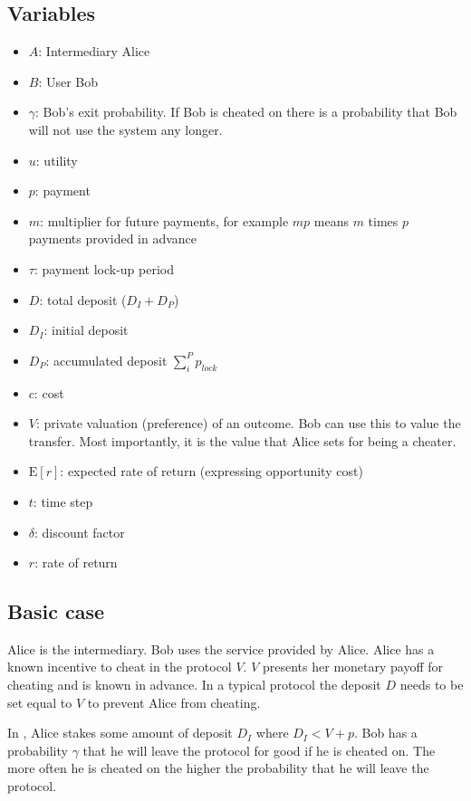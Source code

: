 \subsection{Variables}
\begin{itemize}
    \item $A$: Intermediary Alice
    \item $B$: User Bob
    \item $\gamma$: Bob's exit probability. If Bob is cheated on there is a probability that Bob will not use the system any longer.
    \item $u$: utility
    \item $p$: payment
    \item $m$: multiplier for future payments, for example $mp$ means $m$ times $p$ payments provided in advance
    \item $\tau$: payment lock-up period
    \item $D$: total deposit ($D_I + D_P$)
    \item $D_I$: initial deposit
    \item $D_P$: accumulated deposit $\sum_i^{P} p_{lock}$
    \item $c$: cost
    \item $V$: private valuation (preference) of an outcome. Bob can use this to value the transfer. Most importantly, it is the value that Alice sets for being a cheater.
    \item $\mathrm{E}[r]$: expected rate of return (expressing opportunity cost)
    \item $t$: time step
    \item $\delta$: discount factor
    \item $r$: rate of return
\end{itemize}

\subsection{Basic case}
Alice is the intermediary.
Bob uses the service provided by Alice.
Alice has a known incentive to cheat in the protocol $V$.
$V$ presents her monetary payoff for cheating and is known in advance.
In a typical protocol the deposit $D$ needs to be set equal to $V$ to prevent Alice from cheating.

In \sys, Alice stakes some amount of deposit $D_I$ where $D_I < V + p$.
Bob has a probability $\gamma$ that he will leave the protocol for good if he is cheated on.
The more often he is cheated on the higher the probability that he will leave the protocol.

